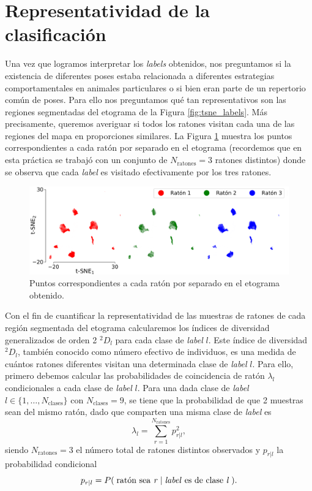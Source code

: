 \section{Representatividad de la clasificación}\label{sec:diversidad}

Una vez que logramos interpretar los \textit{labels} obtenidos, nos preguntamos si la existencia de diferentes poses estaba relacionada a diferentes estrategias comportamentales en animales particulares o si bien eran parte de un repertorio común de poses. Para ello nos preguntamos qué tan representativos son las regiones segmentadas del etograma de la Figura \ref{fig:tsne_labels}. Más precisamente, queremos averiguar si todos los ratones visitan cada una de las regiones del mapa en proporciones similares. La Figura \ref{fig:tsne_mouse_compare} muestra los puntos correspondientes a cada ratón por separado en el etograma (recordemos que en esta práctica se trabajó con un conjunto de $N_{\mathrm{ratones}}=3$ ratones distintos) donde se observa que cada \textit{label} es visitado efectivamente por los tres ratones. 

\begin{figure}[!htbp]
    \centering
    \includegraphics[width=1\linewidth]{figuras/expertos/labels/mouse_compare_tsne.png}
    \caption{Puntos correspondientes a cada ratón por separado en el etograma obtenido.}
    \label{fig:tsne_mouse_compare}
\end{figure}

Con el fin de cuantificar la representatividad de las muestras de ratones de cada región segmentada del etograma calcularemos los índices de diversidad generalizados de orden 2 ${}^{2}D_l$ para cada clase de \textit{label} $l$. Este índice de diversidad ${}^{2}D_l$, también conocido como número efectivo de individuos, es una medida de cuántos ratones diferentes visitan una determinada clase de \textit{label} $l$. Para ello, primero debemos calcular las probabilidades de coincidencia de ratón $\lambda_l$ condicionales a cada clase de \textit{label} $l$. Para una dada clase de \textit{label} $l \in \{ 1, \dots, N_{\mathrm{clases}} \}$ con $N_{\mathrm{clases}} = 9$, se tiene que la probabilidad de que 2 muestras sean del mismo ratón, dado que comparten una misma clase de \textit{label} es
\begin{equation}
    \lambda_l = \sum_{r=1}^{N_{\mathrm{ratones}}} p_{r|l}^2,
\end{equation}
siendo $N_{\mathrm{ratones}}=3$ el número total de ratones distintos observados y $p_{r|l}$ la probabilidad condicional
\begin{equation}
    p_{r|l} = P(\; \text{ratón sea \textit{r}} \;|\; \text{\textit{label} es de clase \textit{l}} \;).
\end{equation}

